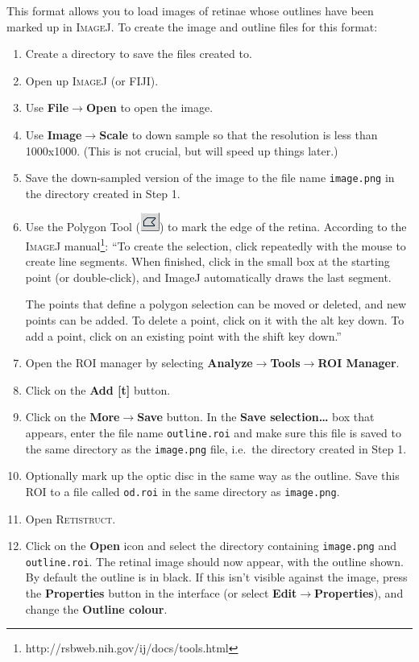\documentclass{book}
\begin{document}
This format allows you to load images of retinae whose outlines have
been marked up in \textsc{ImageJ}. To create the image and outline
files for this format:
\begin{enumerate}
\item Create a directory to save the files created to.
\item Open up \textsc{ImageJ} (or FIJI).
\item Use \textbf{File$\rightarrow$Open} to open the image.
\item Use \textbf{Image$\rightarrow$Scale} to down sample so that the
  resolution is less than 1000x1000. (This is not crucial, but will
  speed up things later.)
\item Save the down-sampled version of the image to the file name
  \texttt{image.png} in the directory created in Step 1.
\item Use the Polygon Tool
  (\includegraphics[height=\baselineskip]{poly}) to mark the edge of
  the retina. According to the \textsc{ImageJ}
  manual\footnote{http://rsbweb.nih.gov/ij/docs/tools.html}: ``To
  create the selection, click repeatedly with the mouse to create line
  segments. When finished, click in the small box at the starting
  point (or double-click), and ImageJ automatically draws the last
  segment.

  The points that define a polygon selection can be moved or deleted,
  and new points can be added. To delete a point, click on it with the
  alt key down. To add a point, click on an existing point with the
  shift key down.''
\item Open the ROI manager by selecting
\textbf{Analyze$\rightarrow$Tools$\rightarrow$ROI Manager}.
\item Click on the \textbf{Add [t]} button.
\item Click on the \textbf{More$\rightarrow$Save} button. In the \textbf{Save
selection\dots} box that appears, enter the file name
\texttt{outline.roi} and make sure this file is saved to the same
directory as the \texttt{image.png} file, i.e.\ the directory created
in Step 1.
\item Optionally mark up the optic disc in the same way as the
  outline. Save this ROI to a file called \texttt{od.roi} in the same
  directory as \texttt{image.png}.
\item Open \textsc{Retistruct}.
\item Click on the \textbf{Open} icon and select the directory
containing \texttt{image.png} and \texttt{outline.roi}. The retinal
image should now appear, with the outline shown. By default the
outline is in black. If this isn't visible against the image, press
the \textbf{Properties} button in the interface (or select \textbf{Edit$\rightarrow$Properties}), and change the
\textbf{Outline colour}.
\end{enumerate}
\end{document}
